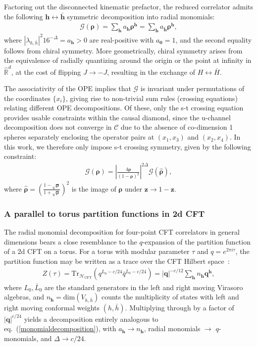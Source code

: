 \documentclass[a4paper,11pt]{article}
\theoremstyle{plain}
\theoremstyle{definition}
\theoremstyle{remark}
\newcommand{\bs}[1]{\boldsymbol{#1}}
\newcommand{\bh}{{\bar{h}}}
\newcommand{\ba}{\begin{equation} \begin{aligned}}
\newcommand{\ea}{\end{aligned} \end{equation}}
\newcommand{\De}{\Delta}
\begin{document}
Factoring out the disconnected kinematic prefactor, the reduced correlator admits the following $\bs{h} \leftrightarrow\bar{\bs{h}}$ symmetric decomposition into radial monomials:
\ba
\mathcal{G}(\bs{\rho}) = \sum_{\bs{h}} a_{\bs{h}} \bs{\rho}^{\bs{h}} = \sum_{\bs{h}} a_{\bar{\bs{h}}} \bs{\rho}^{\bs{h}},
\label{monomialdecomposition}
\ea
where $|\lambda_{h,\bh}|^2 16^{-\De} = a_{\bs{h}}>0$ are real-positive with $a_{\bs{0}} = 1$, and the second equality follows from chiral symmetry. More geometrically, chiral symmetry arises from the equivalence of radially quantizing around the origin or the point at infinity in $\widehat{\mathbb{R}}^d$, at the cost of flipping $J \to -J$, resulting in the exchange of $H \leftrightarrow \bar{H}$.
 
The associativity of the OPE implies that $\mathcal{G}$ is invariant under permutations of the coordinates $\{x_i\}$, giving rise to non-trivial sum rules (crossing equations) relating different OPE decompositions. Of these, only the s-t crossing equation provides usable constraints within the causal diamond, since the u-channel decomposition does not converge in $\mathscr{C}$ due to the absence of co-dimension 1 spheres separately enclosing the operator pairs at $(x_1,x_3)$ and $(x_2,x_4)$. In this work, we therefore only impose s-t crossing symmetry, given by the following constraint:
\ba
\label{stcrossing}
\mathcal{G}(\bs{\rho}) = \left|\frac{4 \bs{\rho}}{(1-\bs{\rho})^2}\right|^{2\De}\mathcal{G}(\hat{\bs{\rho}}),
\ea
where $\hat{\bs{\rho}} = \left(\frac{1-\sqrt{\bs{\rho}}}{1+\sqrt{\bs{\rho}}} \right)^2$ is the image of $\bs{\rho}$ under $\bs{z} \to 1-\bs{z}$.


\subsubsection{A parallel to torus partition functions in 2d CFT}

The radial monomial decomposition for four-point CFT correlators in general dimensions bears a close resemblance to the $q$-expansion of the partition function of a 2d CFT on a torus. For a torus with modular parameter $\tau$ and $q = e^{2\pi i \tau}$, the partition function may be written as a trace over the CFT Hilbert space~\cite{Simmons-Duffin2016-nn}:
\ba
Z(\tau) = \text{Tr}_{\mathcal{H}_{\mathrm{CFT}}}\left( q^{L_0 - c/24} \bar{q}^{\bar{L}_0 - c/24} \right) = |\bs{q}|^{-c/12}\sum_{\bs{h}} n_{\bs{h}} \bs{q}^{\bs{h}},
\ea
where $L_0, \bar{L}_0$ are the standard generators in the left and right moving Virasoro algebras, and $n_{\bs{h}} = \mathrm{dim}(V_{h,\bh})$ counts the multiplicity of states with left and right moving conformal weights $(h,\bh)$. Multiplying through by a factor of $|\bs{q}|^{c/24}$ yields a decomposition entirely analogous to eq.~(\ref{monomialdecomposition}), with $a_{\bs{h}} \to n_{\bs{h}}$, radial monomials $\to$ $q$-monomials, and $\De \to c/24$.
 
\end{document}
